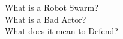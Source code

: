 \documentclass[preview]{standalone}
\begin{document}
What is a Robot Swarm?\\What is a Bad Actor?\\What does it mean to Defend?\\
\end{document}
